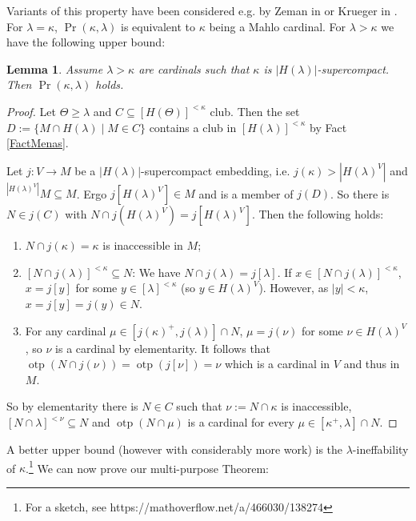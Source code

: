 \documentclass[a4paper]{amsart}
\theoremstyle{definition}
\theoremstyle{remark}
\theoremstyle{plain}
\newtheorem{mylem}[mydef]{Lemma}
\numberwithin{mydef}{section}
\DeclareMathOperator{\otp}{otp}
\begin{document}
	Variants of this property have been considered e.g. by Zeman in \cite{ZemanConStrength} or Krueger in \cite{KruegerDestroyStatSets}. For $\lambda=\kappa$, $\Pr(\kappa,\lambda)$ is equivalent to $\kappa$ being a Mahlo cardinal. For $\lambda>\kappa$ we have the following upper bound:
	
	\begin{mylem}
		Assume $\lambda>\kappa$ are cardinals such that $\kappa$ is $|H(\lambda)|$-supercompact. Then $\Pr(\kappa,\lambda)$ holds.
	\end{mylem}
	
	\begin{proof}
		Let $\Theta\geq\lambda$ and $C\subseteq[H(\Theta)]^{<\kappa}$ club. Then the set $D:=\{M\cap H(\lambda)\;|\;M\in C\}$ contains a club in $[H(\lambda)]^{<\kappa}$ by Fact \ref{FactMenas}.
		
		Let $j\colon V\to M$ be a $|H(\lambda)|$-supercompact embedding, i.e. $j(\kappa)>|H(\lambda)^V|$ and ${}^{|H(\lambda)^V|}M\subseteq M$. Ergo $j[H(\lambda)^V]\in M$ and is a member of $j(D)$. So there is $N\in j(C)$ with $N\cap j(H(\lambda)^V)=j[H(\lambda)^V]$. Then the following holds:
		\begin{enumerate}
			\item $N\cap j(\kappa)=\kappa$ is inaccessible in $M$;
			\item $[N\cap j(\lambda)]^{<\kappa}\subseteq N$: We have $N\cap j(\lambda)=j[\lambda]$. If $x\in[N\cap j(\lambda)]^{<\kappa}$, $x=j[y]$ for some $y\in[\lambda]^{<\kappa}$ (so $y\in H(\lambda)^V$). However, as $|y|<\kappa$, $x=j[y]=j(y)\in N$.
			\item For any cardinal $\mu\in[j(\kappa)^+,j(\lambda)]\cap N$, $\mu=j(\nu)$ for some $\nu\in H(\lambda)^V$, so $\nu$ is a cardinal by elementarity. It follows that $\otp(N\cap j(\nu))=\otp(j[\nu])=\nu$ which is a cardinal in $V$ and thus in $M$.
		\end{enumerate}
		
		So by elementarity there is $N\in C$ such that $\nu:=N\cap\kappa$ is inaccessible, $[N\cap\lambda]^{<\nu}\subseteq N$ and $\otp(N\cap\mu)$ is a cardinal for every $\mu\in[\kappa^+,\lambda]\cap N$.
	\end{proof}
	
	A better upper bound (however with considerably more work) is the $\lambda$-ineffability of $\kappa$.\footnote{For a sketch, see https://mathoverflow.net/a/466030/138274} We can now prove our multi-purpose Theorem:
	
\end{document}
